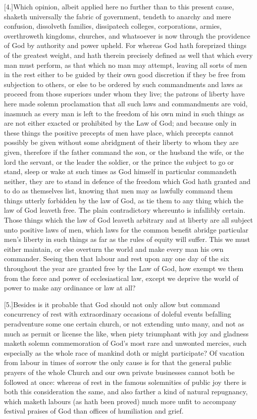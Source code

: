 [4.]Which opinion, albeit applied here no further than to this present cause, shaketh universally the fabric of government, tendeth to anarchy and mere confusion, dissolveth families, dissipatech colleges, corporations, armies, overthroweth  kingdoms, churches, and whatsoever is now through the providence of God by authority and power upheld. For whereas God hath foreprized things of the greatest weight, and hath therein precisely defined as well that which every man must perform, as that which no man may attempt, leaving all sorts of men in the rest either to be guided by their own good discretion if they be free from subjection to others, or else to be ordered by such commandments and laws as proceed from those superiors under whom they live; the patrons of liberty have here made solemn proclamation that all such laws and commandments are void, inasmuch as every man is left to the freedom of his own mind in such things as are not either exacted or prohibited by the Law of God; and because only in these things the positive precepts of men have place, which precepts cannot possibly be given without some abridgment of their liberty to whom they are given, therefore if the father command the son, or the husband the wife, or the lord the servant, or the leader the soldier, or the prince the subject to go or stand, sleep or wake at such times as God himself in particular commandeth neither, they are to stand in defence of the freedom which God hath granted and to do as themselves list, knowing that men may as lawfully command them things utterly forbidden by the law of God, as tie them to any thing which the law of God leaveth free. The plain contradictory whereunto is infallibly certain. Those  things which the law of God leaveth arbitrary and at liberty are all subject unto positive laws of men,
 which laws for the common benefit abridge particular men’s liberty in such things as far as the rules of equity will suffer. This we must either maintain, or else overturn the world and make every man his own commander. Seeing then that labour and rest upon any one day of the six throughout the year are granted free by the Law of God, how exempt we them from the force and power of ecclesiastical law, except we deprive the world of power to make any ordinance or law at all?

[5.]Besides is it probable that God should not only allow but command concurrency of rest with extraordinary occasions of doleful events befalling peradventure some one certain church, or not extending unto many, and not as much as permit or license the like, when piety triumphant with joy and gladness maketh solemn commemoration of God’s most rare and unwonted mercies, such especially as the whole race of mankind doth or might participate? Of vacation from labour in times of sorrow the only cause is for that the general public prayers of the whole Church and our own private businesses cannot both be followed at once: whereas of rest in the famous solemnities of public joy there is both this consideration the same, and also farther a kind of natural repugnancy, which maketh labours (as hath been proved) much more unfit to accompany festival praises of God than offices of humiliation and grief.

